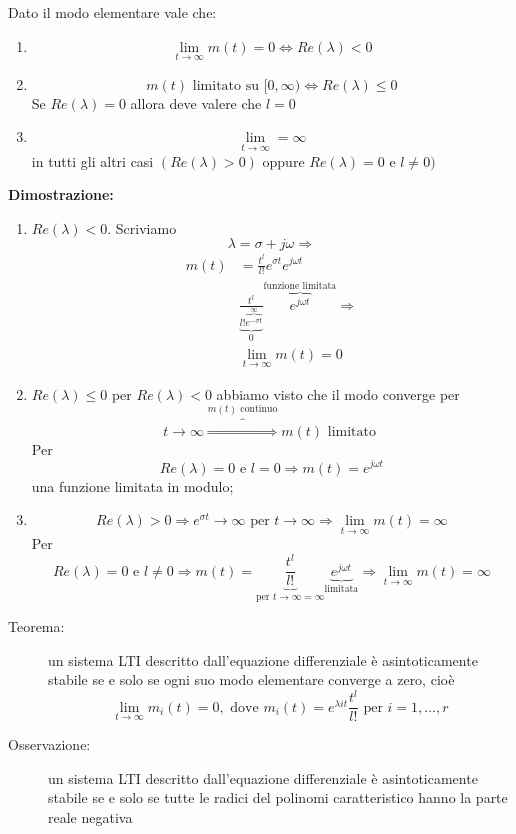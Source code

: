 \documentclass[a4paper, 12pt]{book}
\theoremstyle{plain}
\begin{document}
Dato il modo elementare vale che:

\begin{enumerate}
    \item \[\lim_{t \rightarrow \infty} m(t) = 0 \Leftrightarrow Re(\lambda) < 0\]
    \item \[m(t) \textrm{ limitato su } [0, \infty) \Leftrightarrow Re(\lambda) \le 0\] Se $Re(\lambda) = 0$ allora deve valere che $l = 0$
    \item \[\lim_{t \rightarrow \infty} = \infty\] in tutti gli altri casi $(Re(\lambda) > 0)$ oppure $Re(\lambda) = 0$ e $l \neq 0)$
\end{enumerate}

\textbf{Dimostrazione:}

\begin{enumerate}
    \item $Re(\lambda) < 0$. Scriviamo \[\lambda = \sigma + j\omega \Rightarrow\] \[\begin{split}
        m(t) &= \frac{t^l}{l!}e^{\sigma t}e^{j\omega t} \\
        &\underbrace{\frac{t^l}{l!\overbrace{e^{-\sigma t}}^{\infty}}}_0 \overbrace{e^{j\omega t}}^{\textrm{funzione limitata}} \Rightarrow \\
        &\lim_{t \rightarrow \infty} m(t) = 0
    \end{split}\]
    \item $Re(\lambda) \le 0$ per $Re(\lambda) < 0$  abbiamo visto che il modo converge per \[t \rightarrow \infty \overbrace{\Rightarrow}^{m(t) \textrm{ continuo}} m(t) \textrm{ limitato }\] Per \[Re(\lambda) = 0 \textrm{ e } l = 0 \Rightarrow m(t) = e^{j\omega t}\] una funzione limitata in modulo;
    \item \[Re(\lambda) > 0 \Rightarrow e^{\sigma t} \rightarrow \infty \textrm{ per } t \rightarrow \infty \Rightarrow \lim_{t \rightarrow \infty} m(t) = \infty\] Per \[Re(\lambda) = 0 \textrm{ e } l \neq 0 \Rightarrow m(t) = \underbrace{\frac{t^l}{l!}}_{\textrm{per } t\rightarrow \infty = \infty} \underbrace{e^{j\omega t}}_{\textrm{limitata}} \Rightarrow \lim_{t \rightarrow \infty} m(t) = \infty\]
\end{enumerate}

\begin{description}
    \item[Teorema:] un sistema LTI descritto dall'equazione differenziale è asintoticamente stabile se e solo se ogni suo modo elementare converge a zero, cioè \[\lim_{t \rightarrow \infty} m_i(t) = 0, \textrm{ dove } m_i(t) = e^{\lambda it} \frac{t^l}{l!} \textrm{ per } i = 1, \dots, r\]
    \item[Osservazione:] un sistema LTI descritto  dall'equazione differenziale è asintoticamente stabile se e solo se tutte le radici del polinomi caratteristico hanno la parte reale negativa
\end{description}
\end{document}
